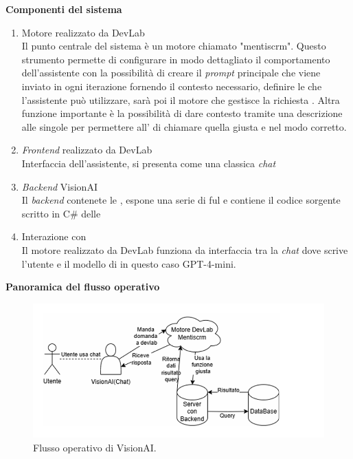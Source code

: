 \textbf{Componenti del sistema}
\begin{enumerate}
    \item Motore realizzato da DevLab\\
    Il punto centrale del sistema è un motore  chiamato "mentiscrm". Questo strumento permette di configurare in modo dettagliato il comportamento dell'assistente con la possibilità di creare il \textit{prompt} principale che viene inviato in ogni iterazione fornendo il contesto necessario, definire le   che l'assistente può utilizzare, sarà poi il motore che gestisce la richiesta . Altra funzione importante è la possibilità di dare contesto tramite una descrizione alle singole  per permettere all' di chiamare quella giusta e nel modo corretto.
    \item \textit{Frontend} realizzato da DevLab \\
    Interfaccia dell'assistente, si presenta come una classica \textit{chat}  
    \item \textit{Backend} VisionAI \\
    Il \textit{backend} contenete le , espone una serie di  ful e contiene il codice sorgente scritto in C\# delle 
    \item Interazione con  \\
    Il motore realizzato da DevLab funziona da interfaccia tra la \textit{chat} dove scrive l'utente e il modello di  in questo caso GPT-4-mini.
\end{enumerate}

\textbf{Panoramica del flusso operativo}

\begin{figure}[H]
    \centering
    \includegraphics[width=\textwidth]{thesis/files/img/FlussoDatiVisionAI.PNG}
    \caption{Flusso operativo di VisionAI.}
    \label{fig:Architettura-generale}
\end{figure}

